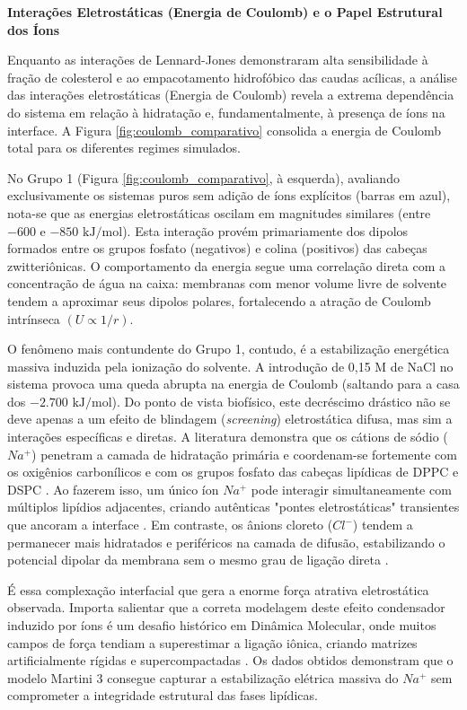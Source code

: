\vspace{1em}
\noindent\textbf{ Interações Eletrostáticas (Energia de Coulomb) e o Papel Estrutural dos Íons}

Enquanto as interações de Lennard-Jones demonstraram alta sensibilidade à fração de colesterol e ao empacotamento hidrofóbico das caudas acílicas, a análise das interações eletrostáticas (Energia de Coulomb) revela a extrema dependência do sistema em relação à hidratação e, fundamentalmente, à presença de íons na interface. A Figura \ref{fig:coulomb_comparativo} consolida a energia de Coulomb total para os diferentes regimes simulados.

No Grupo 1 (Figura \ref{fig:coulomb_comparativo}, à esquerda), avaliando exclusivamente os sistemas puros sem adição de íons explícitos (barras em azul), nota-se que as energias eletrostáticas oscilam em magnitudes similares (entre $-600$ e $-850\text{ kJ/mol}$). Esta interação provém primariamente dos dipolos formados entre os grupos fosfato (negativos) e colina (positivos) das cabeças zwitteriônicas. O comportamento da energia segue uma correlação direta com a concentração de água na caixa: membranas com menor volume livre de solvente tendem a aproximar seus dipolos polares, fortalecendo a atração de Coulomb intrínseca $(U \propto 1/r)$.

O fenômeno mais contundente do Grupo 1, contudo, é a estabilização energética massiva induzida pela ionização do solvente. A introdução de 0,15 M de NaCl no sistema provoca uma queda abrupta na energia de Coulomb (saltando para a casa dos $-2.700\text{ kJ/mol}$). Do ponto de vista biofísico, este decréscimo drástico não se deve apenas a um efeito de blindagem (\textit{screening}) eletrostática difusa, mas sim a interações específicas e diretas. A literatura demonstra que os cátions de sódio ($Na^+$) penetram a camada de hidratação primária e coordenam-se fortemente com os oxigênios carbonílicos e com os grupos fosfato das cabeças lipídicas de DPPC e DSPC \cite{bockmann2003, javanainen2017}. Ao fazerem isso, um único íon $Na^+$ pode interagir simultaneamente com múltiplos lipídios adjacentes, criando autênticas "pontes eletrostáticas" transientes que ancoram a interface \cite{bockmann2003}. Em contraste, os ânions cloreto ($Cl^-$) tendem a permanecer mais hidratados e periféricos na camada de difusão, estabilizando o potencial dipolar da membrana sem o mesmo grau de ligação direta \cite{reif2017}.

É essa complexação interfacial que gera a enorme força atrativa eletrostática observada. Importa salientar que a correta modelagem deste efeito condensador induzido por íons é um desafio histórico em Dinâmica Molecular, onde muitos campos de força tendiam a superestimar a ligação iônica, criando matrizes artificialmente rígidas e supercompactadas \cite{venable2013, melcr2018}. Os dados obtidos demonstram que o modelo Martini 3 consegue capturar a estabilização elétrica massiva do $Na^+$ sem comprometer a integridade estrutural das fases lipídicas.

